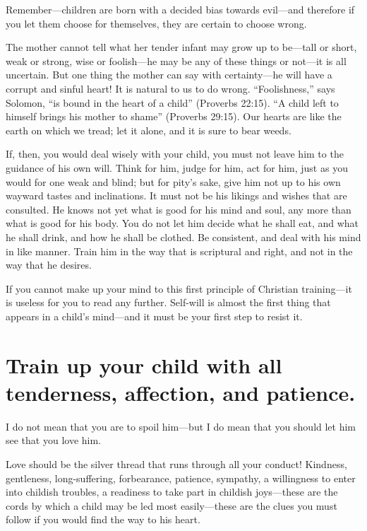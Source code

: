 \documentclass[
]{book}
\begin{document}
Remember---children are born with a decided bias towards evil---and therefore if you let them choose for themselves, they are certain to choose wrong.

The mother cannot tell what her tender infant may grow up to be---tall or short, weak or strong, wise or foolish---he may be any of these things or not---it is all uncertain. But one thing the mother can say with certainty---he will have a corrupt and sinful heart! It is natural to us to do wrong. ``Foolishness,'' says Solomon, ``is bound in the heart of a child'' (Proverbs 22:15). ``A child left to himself brings his mother to shame'' (Proverbs 29:15). Our hearts are like the earth on which we tread; let it alone, and it is sure to bear weeds.

If, then, you would deal wisely with your child, you must not leave him to the guidance of his own will. Think for him, judge for him, act for him, just as you would for one weak and blind; but for pity's sake, give him not up to his own wayward tastes and inclinations. It must not be his likings and wishes that are consulted. He knows not yet what is good for his mind and soul, any more than what is good for his body. You do not let him decide what he shall eat, and what he shall drink, and how he shall be clothed. Be consistent, and deal with his mind in like manner. Train him in the way that is scriptural and right, and not in the way that he desires.

If you cannot make up your mind to this first principle of Christian training---it is useless for you to read any further. Self-will is almost the first thing that appears in a child's mind---and it must be your first step to resist it.

\hypertarget{train-up-your-child-with-all-tenderness-affection-and-patience.}{%
\chapter{Train up your child with all tenderness, affection, and patience.}\label{train-up-your-child-with-all-tenderness-affection-and-patience.}}

I do not mean that you are to spoil him---but I do mean that you should let him see that you love him.

Love should be the silver thread that runs through all your conduct! Kindness, gentleness, long-suffering, forbearance, patience, sympathy, a willingness to enter into childish troubles, a readiness to take part in childish joys---these are the cords by which a child may be led most easily---these are the clues you must follow if you would find the way to his heart.
\end{document}
